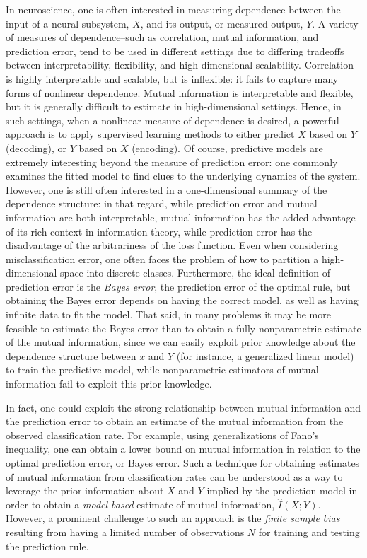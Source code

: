 \documentclass[12pt]{article}
\begin{document}
In neuroscience, one is often interested in measuring dependence
between the input of a neural subsystem, $X$, and its output, or
measured output, $Y$.  A variety of measures of dependence--such
as correlation, mutual information, and prediction error, tend to be
used in different settings due to differing tradeoffs
between interpretability, flexibility, and high-dimensional
scalability.  Correlation is highly interpretable and scalable, but is
inflexible: it fails to capture many forms of nonlinear dependence.
Mutual information is interpretable and flexible, but it is generally
difficult to estimate in high-dimensional settings.  Hence, in such
settings, when a nonlinear measure of dependence is desired, a
powerful approach is to apply supervised learning methods to either
predict $X$ based on $Y$ (decoding), or $Y$ based on $X$ (encoding).
Of course, predictive models are extremely interesting beyond the
measure of prediction error: one commonly examines the fitted model to
find clues to the underlying dynamics of the system.  However, one is
still often interested in a one-dimensional summary of the dependence
structure: in that regard, while prediction error and mutual
information are both interpretable, mutual information has the added
advantage of its rich context in information theory, while prediction
error has the disadvantage of the arbitrariness of the loss function.
Even when considering misclassification error, one often faces the
problem of how to partition a high-dimensional space into discrete
classes.  Furthermore, the ideal definition of prediction error is
the \emph{Bayes error}, the prediction error of the optimal rule, but
obtaining the Bayes error depends on having the correct
model, as well as having infinite data to fit the model.  That said,
in many problems it may be more feasible to estimate the Bayes error
than to obtain a fully nonparametric estimate of the mutual
information, since we can easily exploit prior knowledge about the
dependence structure between $x$ and $Y$ (for instance, a generalized
linear model) to train the predictive model, while nonparametric
estimators of mutual information fail to exploit this prior knowledge.

In fact, one could exploit the strong relationship between mutual
information and the prediction error to obtain an estimate of the
mutual information from the observed classification rate.  For
example, using generalizations of Fano's inequality, one can obtain a
lower bound on mutual information in relation to the optimal
prediction error, or Bayes error.  Such a technique for obtaining
estimates of mutual information from classification rates can be
understood as a way to leverage the prior information about $X$ and
$Y$ implied by the prediction model in order to obtain
a \emph{model-based} estimate of mutual information, $\hat{I}(X; Y)$.
However, a prominent challenge to such an approach is the \emph{finite
sample bias} resulting from having a limited number of observations
$N$ for training and testing the prediction rule.
\end{document}

